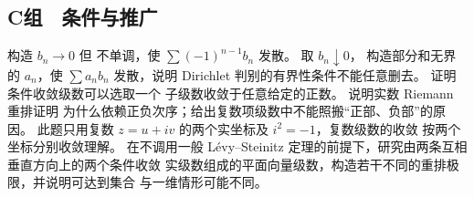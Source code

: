 \subsection*{C组　条件与推广}
\begin{enumerate}[label=\textbf{\thechapter.\arabic*.},resume]
  构造 \(b_n\to0\) 但
 不单调，使 \(\sum(-1)^{n-1}b_n\) 发散。
  取 \(b_n\downarrow0\)，
 构造部分和无界的 \(a_n\)，使 \(\sum a_nb_n\) 发散，说明 Dirichlet
 判别的有界性条件不能任意删去。
  证明条件收敛级数可以选取一个
 子级数收敛于任意给定的正数。
  说明实数 Riemann 重排证明
 为什么依赖正负次序；给出复数项级数中不能照搬“正部、负部”的原因。
 此题只用复数 \(z=u+iv\) 的两个实坐标及 \(i^2=-1\)，复数级数的收敛
 按两个坐标分别收敛理解。
  在不调用一般
 Lévy--Steinitz 定理的前提下，研究由两条互相垂直方向上的两个条件收敛
 实级数组成的平面向量级数，构造若干不同的重排极限，并说明可达到集合
 与一维情形可能不同。
\end{enumerate}
